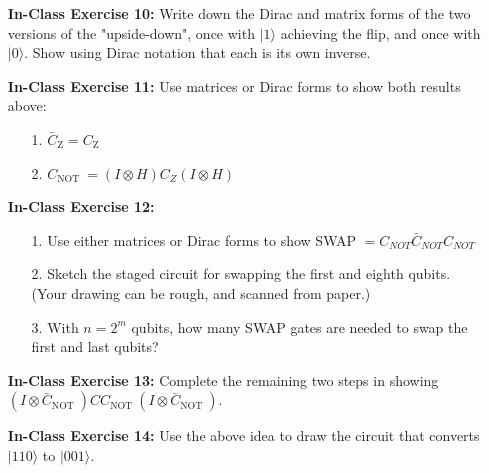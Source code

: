 \documentclass[main.tex]{subfiles}
\begin{document}
\begin{enumerate}
\item[] \textbf{In-Class Exercise 10:} Write down the Dirac and matrix forms of the two versions of the "upside-down", once with $|1\rangle$ achieving the flip, and once with $|0\rangle$. Show using Dirac notation that each is its own inverse. 

\item[] \textbf{In-Class Exercise 11:} Use matrices or Dirac forms to show both results above:
\begin{enumerate}
    \item [1.] $\bar{C}_{\mathrm{Z}}=C_{\mathrm{Z}}$
    \item [2.] $C_{\text {NOT }}=(I \otimes H) C_{Z}(I \otimes H)$
\end{enumerate}

\item[] \textbf{In-Class Exercise 12:}
\begin{enumerate}
    \item [1.] Use either matrices or Dirac forms to show SWAP $=C_{N O T} \bar{C}_{NOT} C_{NOT}$
    \item [2.] Sketch the staged circuit for swapping the first and eighth qubits. (Your drawing can be rough, and scanned from paper.)
    \item [3.] With $n=2^{m}$ qubits, how many SWAP gates are needed to swap the first and last qubits?
\end{enumerate}
 
\item[] \textbf{In-Class Exercise 13:} Complete the remaining two steps in showing $\left(I \otimes \bar{C}_{\text {NOT }}\right) C C_{\text {NOT }}\left(I \otimes \bar{C}_{\text {NOT }}\right)$.

\item[] \textbf{In-Class Exercise 14:} Use the above idea to draw the circuit that converts $|110\rangle$ to $|001\rangle$.

\end{enumerate}
\end{document}

